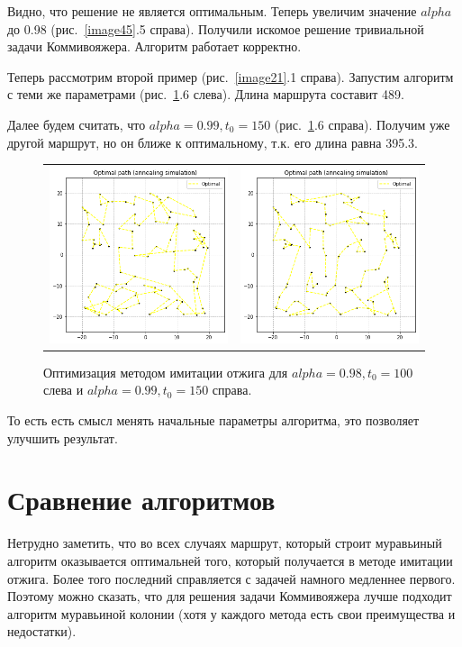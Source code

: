 \documentclass[12pt, a4paper]{article}
\begin{document}
    Видно, что решение не является оптимальным. Теперь увеличим значение 
    $alpha$ до 0.98 (рис.~\ref{image45}.5 справа). Получили искомое решение 
    тривиальной задачи Коммивояжера. Алгоритм работает корректно.
    
    Теперь рассмотрим второй пример (рис.~\ref{image21}.1 справа). 
    Запустим алгоритм с теми же параметрами (рис.~\ref{image46}.6 слева). 
    Длина маршрута составит 489.
    
    Далее будем считать, что $alpha = 0.99, t_{0} = 150$ (рис.~\ref{image46}.6 справа). Получим уже другой маршрут, но он ближе к оптимальному, т.к. его длина равна 395.3.
    
    \begin{figure}[h!]
        \center
        \begin{tabular}{cc}
            \includegraphics[width = 6cm]{dots2_2_3.png} &
            \includegraphics[width = 6cm]{dots2_2_4.png} \\
        \end{tabular}
        \label{image46}
        \caption{Оптимизация методом имитации отжига для $alpha = 0.98, 
            t_{0} = 100$ слева и $alpha = 0.99, t_{0} = 150$ справа.}
    \end{figure}
    
    То есть есть смысл менять начальные параметры алгоритма, это позволяет улучшить результат.
    
    \section{Сравнение алгоритмов}
    
    Нетрудно заметить, что во всех случаях маршрут, который строит 
    муравьиный алгоритм оказывается оптимальней того, который получается в 
    методе имитации отжига. Более того последний справляется с задачей 
    намного медленнее первого. Поэтому можно сказать, что для решения задачи 
    Коммивояжера лучше подходит алгоритм муравьиной колонии (хотя у каждого метода есть свои преимущества и 
    недостатки). 
    
\end{document}

